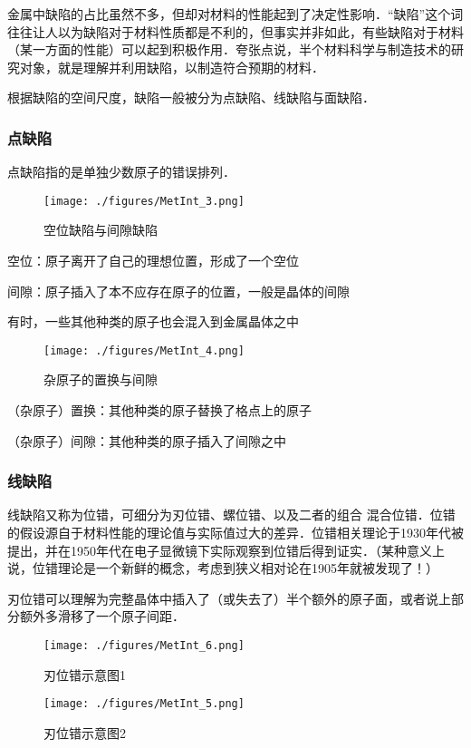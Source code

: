 金属中缺陷的占比虽然不多，但却对材料的性能起到了决定性影响．“缺陷”这个词往往让人以为缺陷对于材料性质都是不利的，但事实并非如此，有些缺陷对于材料（某一方面的性能）可以起到积极作用．夸张点说，半个材料科学与制造技术的研究对象，就是理解并利用缺陷，以制造符合预期的材料．

根据缺陷的空间尺度，缺陷一般被分为点缺陷、线缺陷与面缺陷．

\subsubsection{点缺陷}
点缺陷指的是单独少数原子的错误排列．
\begin{figure}[ht]
\centering
\texttt{[image: ./figures/MetInt\_3.png]}
\caption{空位缺陷与间隙缺陷} \label{MetInt_fig3}
\end{figure}
空位：原子离开了自己的理想位置，形成了一个空位

间隙：原子插入了本不应存在原子的位置，一般是晶体的间隙

有时，一些其他种类的原子也会混入到金属晶体之中
\begin{figure}[ht]
\centering
\texttt{[image: ./figures/MetInt\_4.png]}
\caption{杂原子的置换与间隙} \label{MetInt_fig4}
\end{figure}

（杂原子）置换：其他种类的原子替换了格点上的原子

（杂原子）间隙：其他种类的原子插入了间隙之中

\subsubsection{线缺陷}
线缺陷又称为位错，可细分为刃位错、螺位错、以及二者的组合 混合位错．位错的假设源自于材料性能的理论值与实际值过大的差异．位错相关理论于1930年代被提出，并在1950年代在电子显微镜下实际观察到位错后得到证实．（某种意义上说，位错理论是一个新鲜的概念，考虑到狭义相对论在1905年就被发现了！）

刃位错可以理解为完整晶体中插入了（或失去了）半个额外的原子面，或者说上部分额外多滑移了一个原子间距．
\begin{figure}[ht]
\centering
\texttt{[image: ./figures/MetInt\_6.png]}
\caption{刃位错示意图1} \label{MetInt_fig6}
\end{figure}
\begin{figure}[ht]
\centering
\texttt{[image: ./figures/MetInt\_5.png]}
\caption{刃位错示意图2} \label{MetInt_fig5}
\end{figure}

